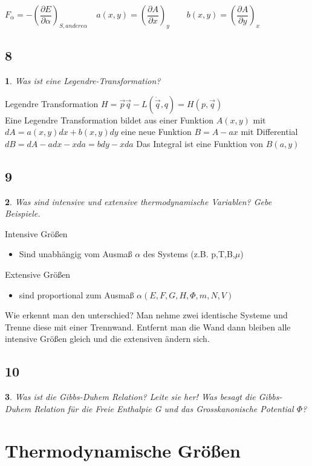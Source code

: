 \documentclass[12pt,a4paper]{report}
\newtheorem{myfrag}{}%
\begin{document}
$ F_\alpha = - \left( \dfrac{\partial E}{\partial \alpha }\right) _{S,andere \alpha} \quad a(x,y)= \left( \dfrac{\partial A}{\partial x}\right) _y \qquad b(x,y) = \left( \dfrac{\partial A}{\partial y }\right) _x$
\subsection{8}
\begin{myfrag}
Was ist eine Legendre-Transformation?
\end{myfrag}
Legendre Transformation $H= \vec{p}\vec{q}-L(\dot{\vec{q}},q)=H(p,\vec{q} )$ \\
Eine Legendre Transformation bildet aus einer Funktion $A(x,y)$ mit $ dA= a(x,y)dx +b(x,y)dy$ eine neue Funktion $B=A-ax$ mit Differential $ dB = dA - adx -xda = bdy -xda$ Das Integral ist eine Funktion von $B(a,y)$
\subsection{9}
\begin{myfrag}
Was sind intensive und extensive thermodynamische Variablen? Gebe
Beispiele.
\end{myfrag} \quad \newline
Intensive Größen 
\begin{itemize}
\item Sind unabhängig vom Ausmaß $\alpha $ des Systems (z.B. p,T,B,$\mu $)
\end{itemize}
Extensive Größen
\begin{itemize}
\item sind proportional zum Ausmaß $\alpha (E,F,G,H, \Phi , m, N, V)$
\end{itemize}
Wie erkennt man den unterschied? Man nehme zwei identische Systeme und Trenne diese mit einer Trennwand. Entfernt man die Wand dann bleiben alle intensive Größen gleich und die extensiven ändern sich.
\subsection{10}
\begin{myfrag}
Was ist die Gibbs-Duhem Relation? Leite sie her! Was besagt die Gibbs-
Duhem Relation für die Freie Enthalpie G und das Grosskanonische
Potential $\Phi$?
\end{myfrag}

\section{Thermodynamische Größen}
\end{document}
